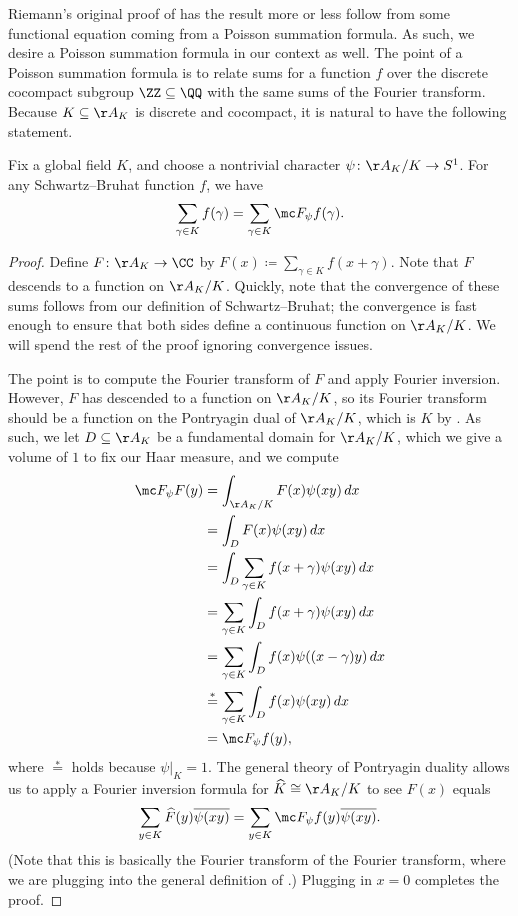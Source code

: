 \documentclass{article}
\begin{document}
Riemann's original proof of  has the result more or less follow from some functional equation coming from a Poisson summation formula. As such, we desire a Poisson summation formula in our context as well. The point of a Poisson summation formula is to relate sums for a function $f$ over the discrete cocompact subgroup $\ZZ\subseteq\QQ$ with the same sums of the Fourier transform. Because $K\subseteq\AA_K$ is discrete and cocompact, it is natural to have the following statement.
\begin{theorem} \label{thm:adelic-p-s}
	Fix a global field $K$, and choose a nontrivial character $\psi\colon\AA_K/K\to S^1$. For any Schwartz--Bruhat function $f$, we have
	\[\sum_{\gamma\in K}f(\gamma)=\sum_{\gamma\in K}\mc F_\psi f(\gamma).\]
\end{theorem}
\begin{proof}
	Define $F\colon\AA_K\to\CC$ by $F(x)\coloneqq\sum_{\gamma\in K}f(x+\gamma)$. Note that $F$ descends to a function on $\AA_K/K$. Quickly, note that the convergence of these sums follows from our definition of Schwartz--Bruhat; the convergence is fast enough to ensure that both sides define a continuous function on $\AA_K/K$. We will spend the rest of the proof ignoring convergence issues.
	
	The point is to compute the Fourier transform of $F$ and apply Fourier inversion. However, $F$ has descended to a function on $\AA_K/K$, so its Fourier transform should be a function on the Pontryagin dual of $\AA_K/K$, which is $K$ by . As such, we let $D\subseteq\AA_K$ be a fundamental domain for $\AA_K/K$, which we give a volume of $1$ to fix our Haar measure, and we compute
	\begin{align*}
		\mc F_\psi F(y) &= \int_{\AA_K/K}F(x)\psi(xy)\,dx \\
		&= \int_DF(x)\psi(xy)\,dx \\
		&= \int_D\sum_{\gamma\in K}f(x+\gamma)\psi(xy)\,dx \\
		&= \sum_{\gamma\in K}\int_Df(x+\gamma)\psi(xy)\,dx \\
		&= \sum_{\gamma\in K}\int_Df(x)\psi((x-\gamma)y)\,dx \\
		&\stackrel*= \sum_{\gamma\in K}\int_Df(x)\psi(xy)\,dx \\
		&= \mc F_\psi f(y),
	\end{align*}
	where $\stackrel*=$ holds because $\psi|_K=1$. The general theory of Pontryagin duality allows us to apply a Fourier inversion formula for $\widehat K\cong\AA_K/K$ to see $F(x)$ equals
	\[\sum_{y\in K}\widehat F(y)\overline{\psi(xy)}=\sum_{y\in K}\mc F_\psi f(y)\overline{\psi(xy)}.\]
	(Note that this is basically the Fourier transform of the Fourier transform, where we are plugging into the general definition of .) Plugging in $x=0$ completes the proof.
\end{proof}
\end{document}
